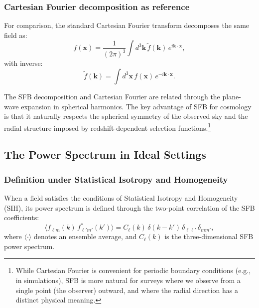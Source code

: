 \subsubsection{Cartesian Fourier decomposition as reference}

For comparison, the standard Cartesian Fourier transform decomposes the same field as:
\begin{equation}
f(\mathbf{x}) = \frac{1}{(2\pi)^3}
\int d^3\mathbf{k}\,\tilde{f}(\mathbf{k})\,e^{i\mathbf{k}\cdot\mathbf{x}},
\label{eq:cartesian_fourier}
\end{equation}
with inverse:
\begin{equation}
\tilde{f}(\mathbf{k}) = \int d^3\mathbf{x}\,f(\mathbf{x})\,e^{-i\mathbf{k}\cdot\mathbf{x}}.
\end{equation}

The SFB decomposition and Cartesian Fourier are related through the plane-wave expansion in spherical harmonics.
The key advantage of SFB for cosmology is that it naturally respects the spherical symmetry of the observed sky
and the radial structure imposed by redshift-dependent selection functions.\footnote{While Cartesian Fourier is
convenient for periodic boundary conditions (e.g., in simulations), SFB is more natural for surveys where we observe
from a single point (the observer) outward, and where the radial direction has a distinct physical meaning.}

\subsection{The Power Spectrum in Ideal Settings}

\subsubsection{Definition under Statistical Isotropy and Homogeneity}

When a field satisfies the conditions of Statistical Isotropy and Homogeneity (SIH), its power spectrum is defined
through the two-point correlation of the SFB coefficients:
\begin{equation}
\bigl\langle f_{\ell m}(k)\,f^*_{\ell' m'}(k')\bigr\rangle
= C_\ell(k)\,\delta(k-k')\,\delta_{\ell\ell'}\,\delta_{mm'},
\label{eq:sfb_power_def}
\end{equation}
where $\langle\cdot\rangle$ denotes an ensemble average, and $C_\ell(k)$ is the three-dimensional SFB power spectrum.

